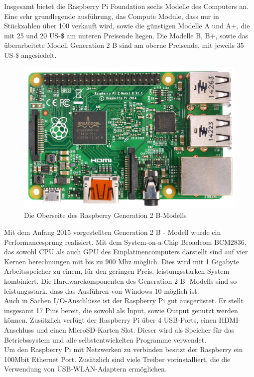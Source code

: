 Insgesamt bietet die Raspberry Pi Foundation sechs Modelle des Computers an. Eine sehr grundlegende ausführung, das Compute Module, dass nur in Stückzahlen über 100 verkauft wird, sowie die günstigen Modelle A und A+, die mit 25 und 20 US-\$ am unteren Preisende liegen. Die Modelle B, B+, sowie das überarbeitete Modell Generation 2 B sind am oberne Preisende, mit jeweils 35 US-\$ angesiedelt. \\

\begin{figure}[H] 
	\centering
	\includegraphics[scale=0.5]{Bilder/raspberry2top}
	\caption{Die Oberseite des Raspberry Generation 2 B-Modells\cite{i:raspberry2top}}
	\label{f:raspberry2top}
\end{figure}

Mit dem Anfang 2015 vorgestellten Generation 2 B - Modell wurde ein Performancesprung realisiert. 
Mit dem System-on-a-Chip Broadcom BCM2836, das sowohl CPU als auch GPU des Einplatinencomputers darstellt sind auf vier Kernen berechnungen mit bis zu 900 \ac{Mhz} möglich. Dies wird mit 1 Gigabyte Arbeitsspeicher zu einem, für den geringen Preis, leistungsstarken System kombiniert.
Die Hardwarekomponenten des Generation 2 B -Modells sind so leistungsstark, dass das Ausführen von Windows 10 möglich ist.\\

Auch in Sachen I/O-Anschlüsse ist der Raspberry Pi gut ausgerüstet. Er stellt insgesamt 17 Pins bereit, die sowohl als Input, sowie Output genutzt werden können. Zusätzlich verfügt der Raspberry Pi über 4 \ac{USB}-Ports, einen HDMI-Anschluss und einen MicroSD-Karten Slot. Dieser wird als Speicher für das Betriebssystem und alle selbstentwickelten Programme verwendet.\\
Um den Raspberry Pi mit Netzwerken zu verbinden besitzt der Raspberry ein 100Mbit Ethernet Port. Zusätzlich sind viele Treiber vorinstalliert, die die Verwendung von USB-WLAN-Adaptern ermöglichen. 

